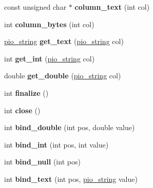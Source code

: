 \begin{DoxyCompactItemize}
\item 
\hypertarget{class_database_a8e67637c124e417274522e41f0cf3796}{
const unsigned char $\ast$ {\bfseries column\_\-text} (int col)}
\label{class_database_a8e67637c124e417274522e41f0cf3796}

\item 
\hypertarget{class_database_a5ac37027c76b693585cabb3671db4180}{
int {\bfseries column\_\-bytes} (int col)}
\label{class_database_a5ac37027c76b693585cabb3671db4180}

\item 
\hypertarget{class_database_acdd45530020083da8bff5cba01beecaa}{
\hyperlink{classpio__string}{pio\_\-string} {\bfseries get\_\-text} (\hyperlink{classpio__string}{pio\_\-string} col)}
\label{class_database_acdd45530020083da8bff5cba01beecaa}

\item 
\hypertarget{class_database_adb0a2dc17a361c52db2454f13d80c75e}{
int {\bfseries get\_\-int} (\hyperlink{classpio__string}{pio\_\-string} col)}
\label{class_database_adb0a2dc17a361c52db2454f13d80c75e}

\item 
\hypertarget{class_database_a17ba509b5e2aedebb7b791bc3bb3201f}{
double {\bfseries get\_\-double} (\hyperlink{classpio__string}{pio\_\-string} col)}
\label{class_database_a17ba509b5e2aedebb7b791bc3bb3201f}

\item 
\hypertarget{class_database_a3a865ad865c97dca74073fbee66e80e4}{
int {\bfseries finalize} ()}
\label{class_database_a3a865ad865c97dca74073fbee66e80e4}

\item 
\hypertarget{class_database_a9b0c49501592440fd474f38738c3255c}{
int {\bfseries close} ()}
\label{class_database_a9b0c49501592440fd474f38738c3255c}

\item 
\hypertarget{class_database_af49ad3a99a723dcbb6a00272aeff142d}{
int {\bfseries bind\_\-double} (int pos, double value)}
\label{class_database_af49ad3a99a723dcbb6a00272aeff142d}

\item 
\hypertarget{class_database_a2dc1e05cc3fbab8470beddcd7ca8a8bf}{
int {\bfseries bind\_\-int} (int pos, int value)}
\label{class_database_a2dc1e05cc3fbab8470beddcd7ca8a8bf}

\item 
\hypertarget{class_database_a53cb4f16d6585eb1c057cc3abef909a9}{
int {\bfseries bind\_\-null} (int pos)}
\label{class_database_a53cb4f16d6585eb1c057cc3abef909a9}

\item 
\hypertarget{class_database_a1211687261b7ef8db7f737de9647fa8a}{
int {\bfseries bind\_\-text} (int pos, \hyperlink{classpio__string}{pio\_\-string} value)}
\label{class_database_a1211687261b7ef8db7f737de9647fa8a}

\end{DoxyCompactItemize}
